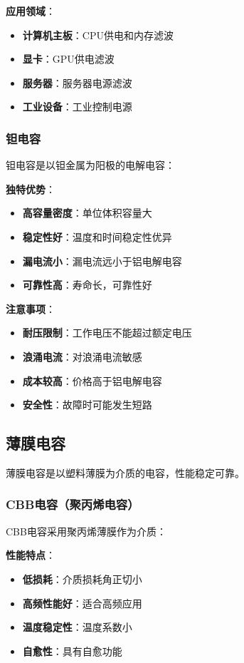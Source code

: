 \documentclass[12pt,UTF8]{ctexbook}
\begin{document}
\textbf{应用领域}：
\begin{itemize}[leftmargin=3.5em]
    \item \textbf{计算机主板}：CPU供电和内存滤波
    \item \textbf{显卡}：GPU供电滤波
    \item \textbf{服务器}：服务器电源滤波
    \item \textbf{工业设备}：工业控制电源
\end{itemize}

\subsubsection{钽电容}

钽电容是以钽金属为阳极的电解电容：

\textbf{独特优势}：
\begin{itemize}[leftmargin=3.5em]
    \item \textbf{高容量密度}：单位体积容量大
    \item \textbf{稳定性好}：温度和时间稳定性优异
    \item \textbf{漏电流小}：漏电流远小于铝电解电容
    \item \textbf{可靠性高}：寿命长，可靠性好
\end{itemize}

\textbf{注意事项}：
\begin{itemize}[leftmargin=3.5em]
    \item \textbf{耐压限制}：工作电压不能超过额定电压
    \item \textbf{浪涌电流}：对浪涌电流敏感
    \item \textbf{成本较高}：价格高于铝电解电容
    \item \textbf{安全性}：故障时可能发生短路
\end{itemize}

\subsection{薄膜电容}

薄膜电容是以塑料薄膜为介质的电容，性能稳定可靠。

\subsubsection{CBB电容（聚丙烯电容）}

CBB电容采用聚丙烯薄膜作为介质：

\textbf{性能特点}：
\begin{itemize}[leftmargin=3.5em]
    \item \textbf{低损耗}：介质损耗角正切小
    \item \textbf{高频性能好}：适合高频应用
    \item \textbf{温度稳定性}：温度系数小
    \item \textbf{自愈性}：具有自愈功能
\end{itemize}
\end{document}
